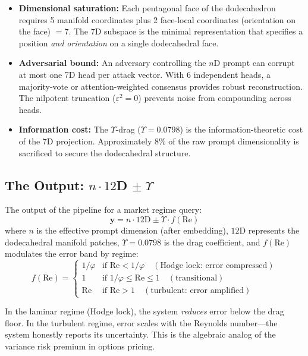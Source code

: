 \begin{itemize}[noitemsep]
  \item \textbf{Dimensional saturation:} Each pentagonal face of the dodecahedron requires 5 manifold coordinates plus 2 face-local coordinates (orientation on the face) $= 7$. The 7D subspace is the minimal representation that specifies a position \emph{and orientation} on a single dodecahedral face.
  \item \textbf{Adversarial bound:} An adversary controlling the $n$D prompt can corrupt at most one 7D head per attack vector. With 6 independent heads, a majority-vote or attention-weighted consensus provides robust reconstruction. The nilpotent truncation ($\varepsilon^2 = 0$) prevents noise from compounding across heads.
  \item \textbf{Information cost:} The $\Upsilon$-drag ($\Upsilon = 0.0798$) is the information-theoretic cost of the 7D projection. Approximately 8\% of the raw prompt dimensionality is sacrificed to secure the dodecahedral structure.
\end{itemize}

\subsection{The Output: $n \cdot 12$D $\pm\;\Upsilon$}

The output of the pipeline for a market regime query:
\begin{equation}
    \mathbf{y} = n \cdot 12\text{D} \pm \Upsilon \cdot f(\mathrm{Re})
\end{equation}
where $n$ is the effective prompt dimension (after embedding), $12$D represents the dodecahedral manifold patches, $\Upsilon = 0.0798$ is the drag coefficient, and $f(\mathrm{Re})$ modulates the error band by regime:
\begin{equation}
    f(\mathrm{Re}) = \begin{cases}
        1/\varphi & \text{if } \mathrm{Re} < 1/\varphi \quad (\text{Hodge lock: error compressed}) \\
        1 & \text{if } 1/\varphi \leq \mathrm{Re} \leq 1 \quad (\text{transitional}) \\
        \mathrm{Re} & \text{if } \mathrm{Re} > 1 \quad (\text{turbulent: error amplified})
    \end{cases}
\end{equation}

In the laminar regime (Hodge lock), the system \emph{reduces} error below the drag floor. In the turbulent regime, error scales with the Reynolds number---the system honestly reports its uncertainty. This is the algebraic analog of the variance risk premium in options pricing.

